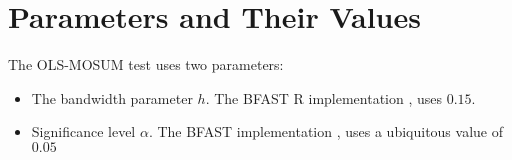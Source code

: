 \documentclass[main.tex]{subfiles}
\begin{document}
\section{Parameters and Their Values}
\label{sec:mosum_parameters}
The OLS-MOSUM test uses two parameters:
\begin{itemize}
\item The bandwidth parameter $h$. The BFAST R implementation
  \cite{bfast-github}, uses $0.15$.
\item Significance level $\alpha$. The BFAST implementation
  \cite{bfast-github}, uses a ubiquitous value of $0.05$
\end{itemize}


\biblio
\end{document}
